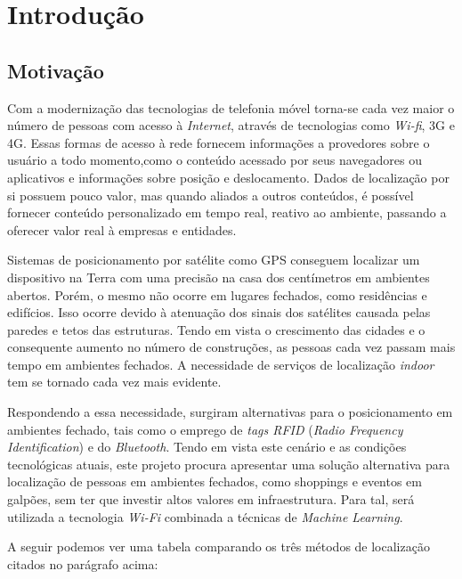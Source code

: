 \chapter{Introdução}\label{chp:introduction}

\section{Motivação}\label{sec:motivation}
Com a modernização das tecnologias de telefonia móvel torna-se cada vez maior o
número de pessoas com acesso à \textit{Internet}, através de tecnologias como \textit{Wi-fi},
3G e 4G. Essas formas de acesso à rede fornecem informações a provedores sobre o
usuário a todo momento,como o conteúdo acessado por seus navegadores ou aplicativos
e informações sobre posição e deslocamento. Dados de localização por si possuem
pouco valor, mas quando aliados a outros conteúdos, é possível fornecer conteúdo
personalizado em tempo real, reativo ao ambiente, passando a oferecer valor real
à empresas e entidades.
\par
Sistemas de posicionamento por satélite como GPS conseguem localizar um dispositivo
na Terra com uma precisão na casa dos centímetros em ambientes abertos. Porém,
o mesmo não ocorre em lugares fechados, como residências e edifícios. Isso ocorre
devido à atenuação dos sinais dos satélites causada pelas paredes e tetos das
estruturas. Tendo em vista o crescimento das cidades e o consequente aumento no
número de construções, as pessoas cada vez passam mais tempo em ambientes
fechados. A necessidade de serviços de localização \textit{indoor} tem se tornado cada
vez mais evidente.
\par
Respondendo a essa necessidade, surgiram alternativas para o posicionamento em
ambientes fechado, tais como o emprego de \textit{tags RFID} (\textit{Radio Frequency Identification}) e do \textit{Bluetooth}. Tendo em vista este
cenário e as condições tecnológicas atuais, este projeto procura apresentar uma
solução alternativa para localização de pessoas em ambientes fechados, como shoppings e
eventos em galpões, sem ter que investir altos valores em infraestrutura. Para tal, será utilizada a tecnologia \textit{Wi-Fi} combinada a técnicas de \textit{Machine Learning}.
\par
A seguir podemos ver uma tabela comparando os três métodos de localização citados no parágrafo acima:

